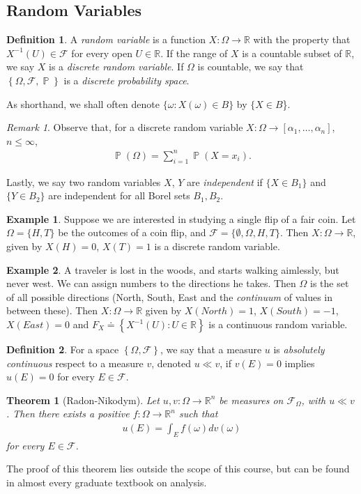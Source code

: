 \documentclass[12pt]{article}
\newcommand{\rr}{\mathbb{R}}
\newcommand{\filter}{\mathcal{F}}
\DeclareMathOperator{\prob}{\mathbb{P}}
\theoremstyle{plain}
\newtheorem{theorem}{Theorem}
\theoremstyle{definition}
\newtheorem*{definition}{Definition}
\newtheorem*{example}{Example}
\theoremstyle{remark}
\newtheorem*{remark}{Remark}
\numberwithin{equation}{section}  %
\begin{document}
\subsection{Random Variables} 
\begin{definition}
	A \emph{random variable} is a function $X: \Omega \to \rr$ with the property
	that $X^{-1}(U) \in \filter$ for every open $U \in \rr$. If the range of $X$
	is a countable subset of $\rr$, we say $X$
	is a \emph{discrete random variable}. If $\Omega$ is countable, we say that 
	$\left\{ \Omega, \filter, \prob \right\}$ is a \emph{discrete probability 
	space}.
\end{definition}
As shorthand, we shall often denote $\{\omega: X(\omega) \in B\}$ by
$\{X \in B$\}.
\begin{remark}
	Observe that, for a discrete random variable $X: \Omega \to [\alpha_1,
	\ldots, \alpha_n]$,  $n \le \infty$, 
	\begin{align*}
		\prob(\Omega) = \sum_{i =1}^n \prob(X = x_i).
	\end{align*}
\end{remark}
Lastly, we say two random variables $X$, $Y$ are \emph{independent} if
$\{X \in B_1\}$ and $\{Y \in B_2\}$ are independent for all Borel sets
$B_1, B_2$. 
\begin{example}
	Suppose we are interested in studying a single flip of a fair coin.
	Let
	$\Omega = \{H, T\}$ be the outcomes of a coin flip, and
	$\filter = \{\emptyset, \Omega, H, T \}$. Then $X: \Omega \to \rr$, given by
	$X(H) = 0$, $X(T) = 1$ is a discrete random variable.
\end{example}
\begin{example}
	A traveler is lost in the woods, and starts walking aimlessly, but never
	west. 
	We can assign numbers to the directions he takes. 
	Then $\Omega$ is the set of all possible directions (North, South, East
	and the \emph{continuum} of values in between these). Then
	$X: \Omega \to \rr$ given by $X(North) = 1$, $X(South) = -1$, $X(East) = 0$
	and $F_{X} \doteq \left\{ X^{-1}(U): U \in \rr \right\}$ is a continuous 
	random
	variable.
\end{example}
\begin{definition}
	For a space $\left\{ \Omega, \filter \right\}$, we say that a measure $u$ is
	\emph{absolutely continuous} respect to a measure $v$, denoted $u \ll v$, if
	$v(E) = 0$ implies $u(E) = 0$ for every $E \in \filter$.
\end{definition}
\begin{theorem}[Radon-Nikodym]
	Let $u,v: \Omega \to \rr^n$ be measures on $\filter_{\Omega}$, with $u \ll 
	v$.
	Then there exists a positive $f: \Omega \to \rr^n$ such that
	\begin{align*}
		u(E) = \int_{E} f(\omega) dv(\omega)
	\end{align*}
	for every $E \in \filter$.
\end{theorem}
The proof of this theorem lies outside the scope of this course, but can be
found in almost every graduate textbook on analysis. 
\end{document}
